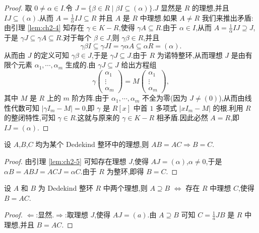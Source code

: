 \begin{proof}
取 $0\neq\alpha\in I$.令 $J=\{\beta\in R\mid \beta I\subseteq(\alpha)\}$.$J$ 显然是 $R$ 的理想,并且 $IJ\subseteq(\alpha)$.从而 $A=\frac{1}{\alpha}IJ\subseteq R$ 并且 $A$ 是 $R$ 中理想.如果 $A\neq R$ 我们来推出矛盾:由引理 \ref{lem:ch2-4} 知存在 $\gamma\in K-R$,使得 $\gamma A\subseteq R$.由于 $\alpha\in I$,从而 $A=\frac{1}{\alpha}IJ\supseteq J$,于是 $\gamma J\subseteq\gamma A\subseteq R$.对于每个 $\beta\in J$,则 $\gamma\beta\in R$,并且
\[
  \gamma\beta I\subseteq\gamma JI=\gamma\alpha A\subseteq\alpha R=(\alpha).
\]
从而由 $J$ 的定义可知 $\gamma\beta\in J$,于是 $\gamma J\subseteq J$.由于 $R$ 为诺特整环,从而理想 $J$ 是由有限个元素 $\alpha_1,\cdots,\alpha_m$ 生成的.由 $\gamma J\subseteq J$ 给出方程组
\[
  \gamma\begin{pmatrix}\alpha_1\\ \vdots\\ \alpha_m\end{pmatrix}
  =M\begin{pmatrix}\alpha_1\\ \vdots\\ \alpha_m\end{pmatrix},
\]
其中 $M$ 是 $R$ 上的 $m$ 阶方阵.由于 $\alpha_1,\cdots,\alpha_m$ 不全为零(因为 $J\neq(0)$),从而由线性代数可知 $|\gamma I_m-M|=0$,即 $\gamma$ 是 $R[x]$ 中首 $1$ 多项式 $|xI_m-M|$ 的根.利用 $R$ 的整闭特性,可知 $\gamma\in R$.这就与原来的 $\gamma\in K-R$ 相矛盾.因此必然 $A=R$,即 $IJ=(\alpha)$.
\end{proof}

\begin{lemma}\label{lem:ch2-6}
设 $A$,$B$,$C$ 均为某个 Dedekind 整环中的理想,则 $AB=AC\Rightarrow B=C$.
\end{lemma}

\begin{proof}
由引理 \ref{lem:ch2-5} 可知存在理想 $J$,使得 $AJ=(\alpha)$,$\alpha\neq 0$,于是 $\alpha B=ABJ=ACJ=\alpha C$.由于 $R$ 为整环,即得 $B=C$.
\end{proof}

\begin{lemma}\label{lem:ch2-7}
设 $A$ 和 $B$ 为 Dedekind 整环 $R$ 中两个理想,则 $A\supseteq B$ $\Leftrightarrow$ 存在 $R$ 中理想 $C$,使得 $B=AC$.
\end{lemma}

\begin{proof}
$\Leftarrow$:显然.$\Rightarrow$:取理想 $J$,使得 $AJ=(a)$.由 $A\supseteq B$ 可知 $C=\frac{1}{a}JB$ 是 $R$ 中理想,并且 $B=AC$.
\end{proof}

